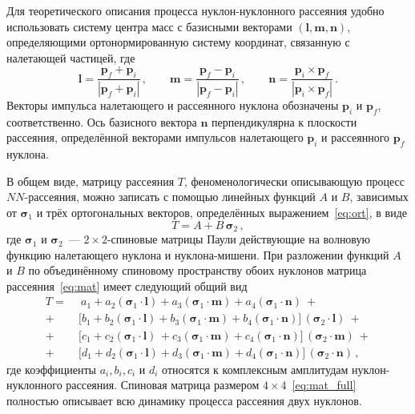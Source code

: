 Для теоретического описания процесса нуклон-нуклонного рассеяния удобно
использовать систему центра масс с базисными векторами $(\mathbf{l, m, n})$,
определяющими ортонормированную систему координат, связанную с налетающей
частицей, где
\begin{equation}
  \label{eq:ort}
  \mathbf{l} =
  \frac{\mathbf{p}_f + \mathbf{p}_i}{|\mathbf{p}_f + \mathbf{p}_i|}\,, \qquad
  \mathbf{m} =
  \frac{\mathbf{p}_f - \mathbf{p}_i}{|\mathbf{p}_f - \mathbf{p}_i|}\,, \qquad
  \mathbf{n} =
  \frac{\mathbf{p}_i \times \mathbf{p}_f}{|\mathbf{p}_i \times \mathbf{p}_f|}\,.
\end{equation}
Векторы импульса налетающего и рассеянного нуклона обозначены $\mathbf{p}_i$ и
$\mathbf{p}_f$, соответственно. Ось базисного вектора $\mathbf{n}$
перпендикулярна к плоскости рассеяния, определённой векторами импульсов
налетающего $\mathbf{p}_i$ и рассеянного $\mathbf{p}_f$ нуклона.

В общем виде, матрицу рассеяния $T$, феноменологически описывающую процесс
$NN$-рассеяния, можно записать с помощью линейных функций $A$ и $B$, зависимых
от $\boldsymbol{\sigma}_1$ и трёх ортогональных векторов, определённых
выражением~\eqref{eq:ort}, в виде
\begin{equation}
  \label{eq:mat}
  T = A + B\,\boldsymbol{\sigma}_2\,,
\end{equation}
где $\boldsymbol{\sigma}_1$ и $\boldsymbol{\sigma}_2$~--- $2 \times 2$-спиновые
матрицы Паули действующие на волновую функцию налетающего нуклона и
нуклона-мишени. При разложении функций $A$ и $B$ по объединённому спиновому
пространству обоих нуклонов матрица рассеяния~\eqref{eq:mat} имеет следующий
общий вид
\begin{equation}
  \label{eq:mat_full}
  \begin{split}
    T = \ &\ a_1 +
    a_2(\boldsymbol{\sigma}_1\cdot\mathbf{l}) +
    a_3(\boldsymbol{\sigma}_1\cdot\mathbf{m}) +
    a_4(\boldsymbol{\sigma}_1\cdot\mathbf{n})\ + \\
    +\ &\bigl[b_1 +
    b_2(\boldsymbol{\sigma}_1\cdot\mathbf{l}) +
    b_3(\boldsymbol{\sigma}_1\cdot\mathbf{m}) +
    b_4(\boldsymbol{\sigma}_1\cdot\mathbf{n})\bigr]
    \,(\boldsymbol{\sigma}_2\cdot\mathbf{l})\ + \\
    +\ &\bigl[c_1 +
    c_2(\boldsymbol{\sigma}_1\cdot\mathbf{l})\,+
    c_3(\boldsymbol{\sigma}_1\cdot\mathbf{m}) +
    c_4(\boldsymbol{\sigma}_1\cdot\mathbf{n})\bigr]
    \,(\boldsymbol{\sigma}_2\cdot\mathbf{m})\ +\\
    +\ &\bigl[d_1 +
    d_2(\boldsymbol{\sigma}_1\cdot\mathbf{l}) +
    d_3(\boldsymbol{\sigma}_1\cdot\mathbf{m}) +
    d_4(\boldsymbol{\sigma}_1\cdot\mathbf{n})\bigr]
    \,(\boldsymbol{\sigma}_2\cdot\mathbf{n})\,,
  \end{split}
\end{equation}
где коэффициенты $a_i, b_i, c_i$ и $d_i$ относятся к комплексным амплитудам
нуклон-нуклонного рассеяния. Спиновая матрица размером
$4 \times 4$~\eqref{eq:mat_full} полностью описывает всю динамику процесса
рассеяния двух нуклонов.


